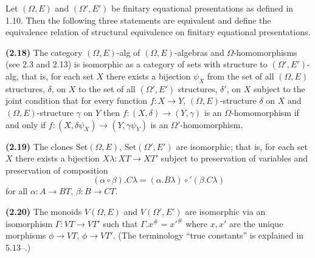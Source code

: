 Let $(\Omega, E)$ and $(\Omega', E')$ be finitary equational presentations as defined in 1.10. Then the following three statements are equivalent and define the equivalence relation of structural equivalence on finitary equational presentations.

\textbf{(2.18)} The category $(\Omega, E)$-alg of $(\Omega, E)$-algebras and $\Omega$-homomorphisms (see 2.3 and 2.13) is isomorphic as a category of sets with structure to $(\Omega', E')$-alg, that is, for each set $X$ there exists a bijection $\psi_X$ from the set of all $(\Omega, E)$ structures, $\delta$, on $X$ to the set of all $(\Omega', E')$ structures, $\delta'$, on $X$ subject to the joint condition that for every function $f: X \longrightarrow Y$, $(\Omega, E)$-structure $\delta$ on $X$ and $(\Omega, E)$-structure $\gamma$ on $Y$ then $f: (X, \delta) \longrightarrow (Y, \gamma)$ is an $\Omega$-homomorphism if and only if $f: (X, \delta\psi_X) \longrightarrow (Y, \gamma\psi_Y)$ is an $\Omega'$-homomorphism.

\textbf{(2.19)} The clones $\text{Set}(\Omega, E)$, $\text{Set}(\Omega', E')$ are isomorphic; that is, for each set $X$ there exists a bijection $X\lambda: XT \longrightarrow XT'$ subject to preservation of variables and preservation of composition
$$
(\alpha \circ \beta).C\lambda = (\alpha.B\lambda) \circ' (\beta.C\lambda)
$$
for all $\alpha: A \longrightarrow BT$, $\beta: B \longrightarrow CT$.

\textbf{(2.20)} The monoids $V(\Omega, E)$ and $V(\Omega', E')$ are isomorphic via an isomorphism $\Gamma: VT \longrightarrow VT'$ such that $\Gamma.x^{\#} = x'^{\#}$ where $x, x'$ are the unique morphisms $\phi \longrightarrow VT$, $\phi \longrightarrow VT'$. (The terminology ``true constants'' is explained in 5.13--.)
